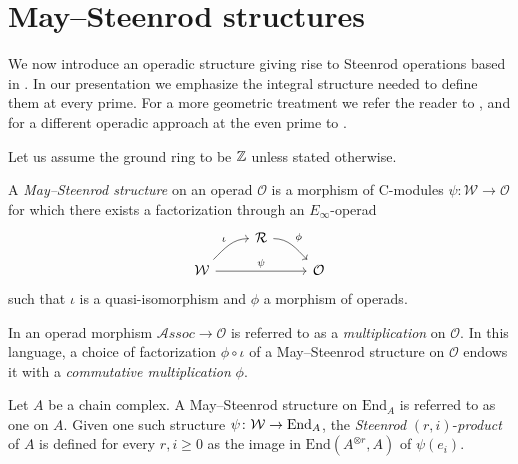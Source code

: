 
\section{May--Steenrod structures} \label{s:steenrod}

We now introduce an operadic structure giving rise to Steenrod operations based in \cite{may70generalapproach}.
In our presentation we emphasize the integral structure needed to define them at every prime.
For a more geometric treatment we refer the reader to \cites{may72geometry, may76homology, lawson2020n}, and for a different operadic approach at the even prime to \cite{chataur2005adem-cartan}.

Let us assume the ground ring to be $\mathbb{Z}$ unless stated otherwise.
\begin{definition} \label{def: May--Steenrod structure}
	A \textit{May--Steenrod structure} on an operad $\mathcal O$ is a 
	morphism of $\mathrm{C}$-modules $\psi \colon \mathcal W \to \mathcal O$ for which there exists a factorization through an $E_\infty$-operad
	\begin{equation*}
	\begin{tikzcd}[column sep = normal, row sep = small]
	& \mathcal R \arrow[dr, "\phi", out=0] & \\
	\mathcal W \arrow[ur, "\iota", in=180] \arrow[rr, "\psi"] & & \mathcal O
	\end{tikzcd}
	\end{equation*}
	such that $\iota$ is a quasi-isomorphism and $\phi$ a morphism of operads.
\end{definition}

\begin{remark} \label{rmk: Deligne conjecture}
	In \cite{GerstenhaberVoronov} an operad morphism $\mathcal{A}ssoc \to \mathcal O$ is referred to as a \textit{multiplication} on $\mathcal O$.
	In this language, a choice of factorization $\phi \circ \iota$ of a May--Steenrod structure on $\mathcal O$ endows it with a \textit{commutative multiplication} $\phi$.
\end{remark}

\begin{definition} \label{def: Steenrod products}
	Let $A$ be a chain complex.
	A May--Steenrod structure on $\mathrm{End}_A$ is referred to as one on $A$.
	Given one such structure $\psi \colon \mathcal W \to \mathrm{End}_A$, the \textit{Steenrod} $(r, i)$-\textit{product} of $A$ is defined for every $r, i \geq 0$ as the image in $ \mathrm{End}(A^{\otimes r}, A)$ of $\psi(e_i)$.
\end{definition}

